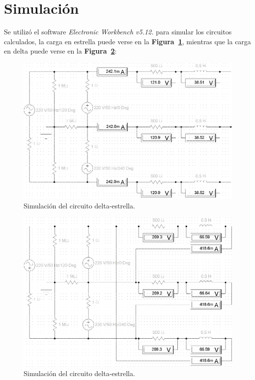 \documentclass[letter,11pt]{article}
\begin{document}
\section{Simulación}
Se utilizó el software \emph{Electronic Workbench v5.12.} para simular
los circuitos calculados, la carga en estrella puede verse en la
\textbf{Figura~\ref{simulacion1}}, mientras que la carga en delta puede verse en
la \textbf{Figura~\ref{simulacion2}}:

\begin{figure}[!h]
\centering
\includegraphics[scale=1.00]{simulacion/practica5.1.eps}
\caption{Simulación del circuito delta-estrella.}
\label{simulacion1}
\end{figure}

\begin{figure}[!h]
\centering
\includegraphics[scale=1.00]{simulacion/practica5.2.eps}
\caption{Simulación del circuito delta-estrella.}
\label{simulacion2}
\end{figure}
\end{document}
